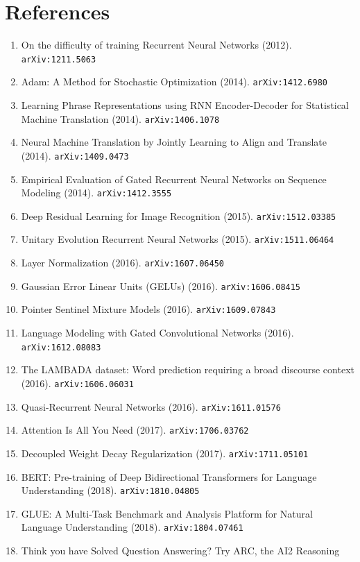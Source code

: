 \documentclass[11pt]{article}
\begin{document}
\section*{References}
\begin{enumerate}\small
  \item On the difficulty of training Recurrent Neural Networks (2012). \texttt{arXiv:1211.5063}
  \item Adam: A Method for Stochastic Optimization (2014). \texttt{arXiv:1412.6980}
  \item Learning Phrase Representations using RNN Encoder-Decoder for
  Statistical Machine Translation (2014). \texttt{arXiv:1406.1078}
  \item Neural Machine Translation by Jointly Learning to Align and Translate (2014). \texttt{arXiv:1409.0473}
  \item Empirical Evaluation of Gated Recurrent Neural Networks on Sequence
  Modeling (2014). \texttt{arXiv:1412.3555}
  \item Deep Residual Learning for Image Recognition (2015). \texttt{arXiv:1512.03385}
  \item Unitary Evolution Recurrent Neural Networks (2015). \texttt{arXiv:1511.06464}
  \item Layer Normalization (2016). \texttt{arXiv:1607.06450}
  \item Gaussian Error Linear Units (GELUs) (2016). \texttt{arXiv:1606.08415}
  \item Pointer Sentinel Mixture Models (2016). \texttt{arXiv:1609.07843}
  \item Language Modeling with Gated Convolutional Networks (2016). \texttt{arXiv:1612.08083}
  \item The LAMBADA dataset: Word prediction requiring a broad discourse context (2016). \texttt{arXiv:1606.06031}
  \item Quasi-Recurrent Neural Networks (2016). \texttt{arXiv:1611.01576}
  \item Attention Is All You Need (2017). \texttt{arXiv:1706.03762}
  \item Decoupled Weight Decay Regularization (2017). \texttt{arXiv:1711.05101}
  \item BERT: Pre-training of Deep Bidirectional Transformers for Language
  Understanding (2018). \texttt{arXiv:1810.04805}
  \item GLUE: A Multi-Task Benchmark and Analysis Platform for Natural Language
  Understanding (2018). \texttt{arXiv:1804.07461}
  \item Think you have Solved Question Answering? Try ARC, the AI2 Reasoning

\end{enumerate}
\end{document}
